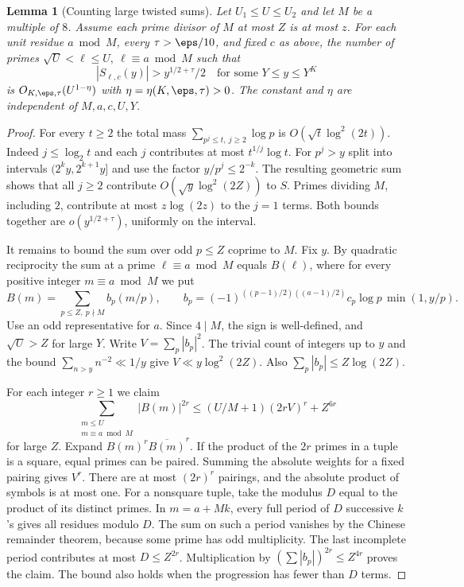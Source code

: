 \documentclass[a4paper,11pt]{article}
\newtheorem{lemma}[proposition]{Lemma}
\theoremstyle{definition}
\theoremstyle{remark}
\numberwithin{equation}{section}
\begin{document}
\begin{lemma}[Counting large twisted sums]\label{lem:high}
Let \(U_1\le U\le U_2\) and let \(M\) be a multiple of \(8\). Assume each prime divisor of \(M\) at most \(Z\) is at most \(z\). For each unit residue \(a\bmod M\), every \(\tau>\eps/10\), and fixed \(c\) as above, the number of primes \(\sqrt U<\ell\le U,\ \ell\equiv a\bmod M\) such that
\[
       |S_{\ell,c}(y)|>y^{1/2+\tau}/2\quad
                         \text{for some }Y\le y\le Y^K
\]
is \(O_{K,\eps,\tau}(U^{1-\eta})\) with \(\eta=\eta(K,\eps,\tau)>0\). The constant and \(\eta\) are independent of \(M,a,c,U,Y\).
\end{lemma}
\begin{proof}
For every \(t\ge2\) the total mass \(\sum_{p^j\le t,\ j\ge2}\log p\) is \(O(\sqrt t\log^2(2t))\). Indeed \(j\le\log_2t\) and each \(j\) contributes at most \(t^{1/j}\log t\). For \(p^j>y\) split into intervals \((2^k y,2^{k+1}y]\) and use the factor \(y/p^j\le2^{-k}\). The resulting geometric sum shows that all \(j\ge2\) contribute \(O(\sqrt y\log^2(2Z))\) to \(S\). Primes dividing \(M\), including \(2\), contribute at most \(z\log(2z)\) to the \(j=1\) terms. Both bounds together are \(o(y^{1/2+\tau})\), uniformly on the interval.

It remains to bound the sum over odd \(p\le Z\) coprime to \(M\). Fix \(y\). By quadratic reciprocity the sum at a prime \(\ell\equiv a\bmod M\) equals \(B(\ell)\), where for every positive integer \(m\equiv a\bmod M\) we put
\[
 B(m)=\sum_{p\le Z,\ p\nmid M} b_p(m/p),\qquad
 b_p=(-1)^{((p-1)/2)((a-1)/2)}c_p\log p\,\min(1,y/p).
\]
Use an odd representative for \(a\). Since \(4\mid M\), the sign is well-defined, and \(\sqrt U>Z\) for large \(Y\). Write \(V=\sum_p|b_p|^2\). The trivial count of integers up to \(y\) and the bound \(\sum_{n>y}n^{-2}\ll1/y\) give \(V\ll y\log^2(2Z)\). Also \(\sum_p|b_p|\le Z\log(2Z)\).

For each integer \(r\ge1\) we claim
\begin{equation}
 \sum_{\substack{m\le U\\m\equiv a\bmod M}}|B(m)|^{2r}
 \le (U/M+1)(2rV)^r+Z^{6r}                                     \label{eq:mom11}
\end{equation}
for large \(Z\). Expand \(B(m)^r\overline{B(m)}^r\). If the product of the \(2r\) primes in a tuple is a square, equal primes can be paired. Summing the absolute weights for a fixed pairing gives \(V^r\). There are at most \((2r)^r\) pairings, and the absolute product of symbols is at most one. For a nonsquare tuple, take the modulus \(D\) equal to the product of its distinct primes. In \(m=a+Mk\), every full period of \(D\) successive \(k\)'s gives all residues modulo \(D\). The sum on such a period vanishes by the Chinese remainder theorem, because some prime has odd multiplicity. The last incomplete period contributes at most \(D\le Z^{2r}\). Multiplication by \((\sum|b_p|)^{2r}\le Z^{4r}\) proves the claim. The bound also holds when the progression has fewer than \(D\) terms.


\end{proof}
\end{document}
